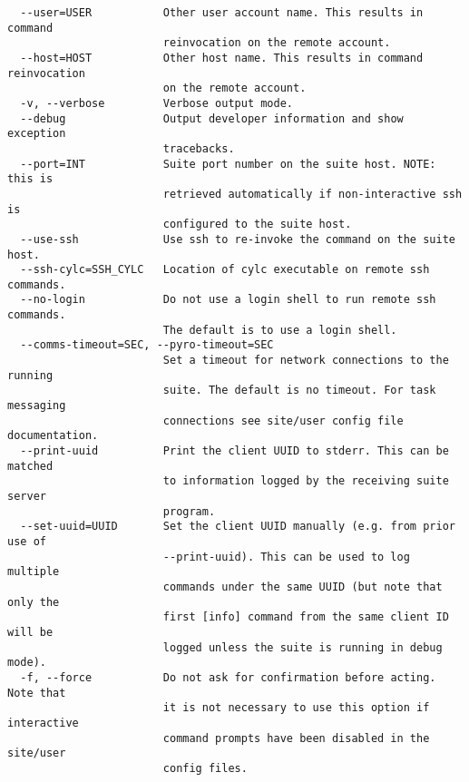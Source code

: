 \begin{lstlisting}
  --user=USER           Other user account name. This results in command
                        reinvocation on the remote account.
  --host=HOST           Other host name. This results in command reinvocation
                        on the remote account.
  -v, --verbose         Verbose output mode.
  --debug               Output developer information and show exception
                        tracebacks.
  --port=INT            Suite port number on the suite host. NOTE: this is
                        retrieved automatically if non-interactive ssh is
                        configured to the suite host.
  --use-ssh             Use ssh to re-invoke the command on the suite host.
  --ssh-cylc=SSH_CYLC   Location of cylc executable on remote ssh commands.
  --no-login            Do not use a login shell to run remote ssh commands.
                        The default is to use a login shell.
  --comms-timeout=SEC, --pyro-timeout=SEC
                        Set a timeout for network connections to the running
                        suite. The default is no timeout. For task messaging
                        connections see site/user config file documentation.
  --print-uuid          Print the client UUID to stderr. This can be matched
                        to information logged by the receiving suite server
                        program.
  --set-uuid=UUID       Set the client UUID manually (e.g. from prior use of
                        --print-uuid). This can be used to log multiple
                        commands under the same UUID (but note that only the
                        first [info] command from the same client ID will be
                        logged unless the suite is running in debug mode).
  -f, --force           Do not ask for confirmation before acting. Note that
                        it is not necessary to use this option if interactive
                        command prompts have been disabled in the site/user
                        config files.
\end{lstlisting}
